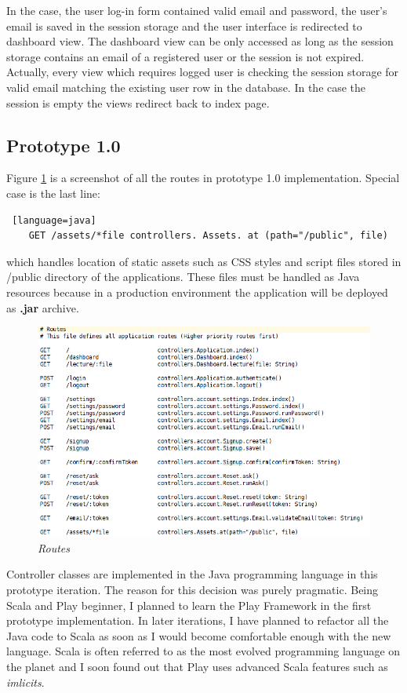 \documentclass[12pt,twoside,a4paper]{report}
\begin{document}
In the case, the user log-in form contained valid email and password, the user's email is saved in the session storage and the user interface is redirected to dashboard view. The dashboard view can be only accessed as long as the session storage contains an email of a registered user or the session is not expired. Actually, every view which requires logged user is checking the session storage for valid email matching the existing user row in the database. In the case the session is empty the views redirect back to index page.

\subsection{Prototype 1.0}\label{4.5.1}

Figure \ref{f4.5.1.1} is a screenshot of all the routes in prototype 1.0 implementation. Special case is the last line:
\begin{lstlisting} [language=java]
	GET /assets/*file controllers. Assets. at (path="/public", file)
\end{lstlisting} 
which handles location of static assets such as CSS styles and script files stored in /public directory of the applications. These files must be handled as Java resources because in a production environment the application will be deployed as \textbf{.jar} archive.

\begin{figure}[!ht]
	\centering
		\includegraphics[width=1\textwidth, totalheight=9cm]
		{routes}
	\caption{\textit{Routes}}
	\label{f4.5.1.1}
\end{figure}

Controller classes are implemented in the Java programming language in this prototype iteration. The reason for this decision was purely pragmatic. Being Scala and Play beginner, I planned to learn the Play Framework in the first prototype implementation. In later iterations, I have planned to refactor all the Java code to Scala as soon as I would become comfortable enough with the new language. Scala is often referred to as the most evolved programming language on the planet and I soon found out that Play uses advanced Scala features such as \emph{imlicits}.
\end{document}

